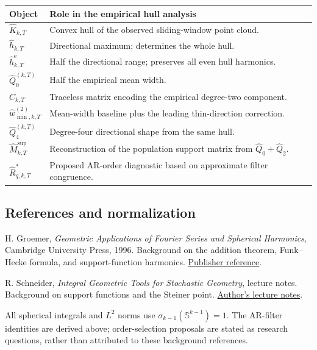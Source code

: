 \documentclass[11pt,a4paper]{article}
\newcommand{\Sph}{\mathbb S}
\newcommand{\he}{\widehat h^{\mathrm e}}
\newcommand{\hh}{\widehat h}
\newcommand{\hQ}{\widehat Q}
\newcommand{\hC}{\widehat C}
\newcommand{\hM}{\widehat M}
\begin{document}
\begin{center}
\renewcommand{\arraystretch}{1.22}
\begin{tabular}{@{}p{3.35cm}p{12.9cm}@{}}
\toprule
\textbf{Object} & \textbf{Role in the empirical hull analysis}\\
\midrule
$\widehat K_{k,T}$ & Convex hull of the observed sliding-window point cloud.\\
$\hh_{k,T}$ & Directional maximum; determines the whole hull.\\
$\he_{k,T}$ & Half the directional range; preserves all even hull harmonics.\\
$\hQ_0^{(k,T)}$ & Half the empirical mean width.\\
$\hC_{k,T}$ & Traceless matrix encoding the empirical degree-two component.\\
$\widehat w_{\min,k,T}^{(2)}$ & Mean-width baseline plus the leading thin-direction correction.\\
$\hQ_4^{(k,T)}$ & Degree-four directional shape from the same hull.\\
$\hM_{k,T}^{\mathrm{sup}}$ & Reconstruction of the population support matrix from $\hQ_0+\hQ_2$.\\
$\widehat R_{q,k,T}^{*}$ & Proposed AR-order diagnostic based on approximate filter congruence.\\
\bottomrule
\end{tabular}
\end{center}

\subsection*{References and normalization}
H. Groemer, \emph{Geometric Applications of Fourier Series and Spherical Harmonics},
Cambridge University Press, 1996. Background on the addition theorem,
Funk--Hecke formula, and support-function harmonics.
\href{https://www.cambridge.org/core/books/geometric-applications-of-fourier-series-and-spherical-harmonics/13DF62702900BE0560420729C0808474}{Publisher reference}.

R. Schneider, \emph{Integral Geometric Tools for Stochastic Geometry}, lecture
notes. Background on support functions and the Steiner point.
\href{https://wwwalt.math.kit.edu/stoch/seite/konvgeo_cime04/media/notes_schneider.pdf}{Author's lecture notes}.

All spherical integrals and $L^2$ norms use $\sigma_{k-1}(\Sph^{k-1})=1$.
The AR-filter identities are derived above; order-selection proposals are stated
as research questions, rather than attributed to these background references.
\end{document}
